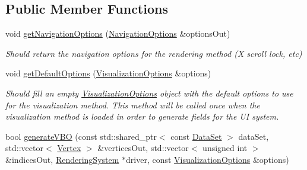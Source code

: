 \subsection*{Public Member Functions}
\begin{DoxyCompactItemize}
\item 
void \hyperlink{class_lots_of_lines_1_1_parallel_coordinates_visualization_method_a9fc4a16e5616115ad9e8c983fefb80ab}{get\+Navigation\+Options} (\hyperlink{struct_lots_of_lines_1_1_navigation_options}{Navigation\+Options} \&options\+Out)\hypertarget{class_lots_of_lines_1_1_parallel_coordinates_visualization_method_a9fc4a16e5616115ad9e8c983fefb80ab}{}\label{class_lots_of_lines_1_1_parallel_coordinates_visualization_method_a9fc4a16e5616115ad9e8c983fefb80ab}

\begin{DoxyCompactList}\small\item\em Should return the navigation options for the rendering method (X scroll lock, etc) \end{DoxyCompactList}\item 
void \hyperlink{class_lots_of_lines_1_1_parallel_coordinates_visualization_method_a47f47082f6638364ca12c521b8520e30}{get\+Default\+Options} (\hyperlink{class_lots_of_lines_1_1_visualization_options}{Visualization\+Options} \&options)\hypertarget{class_lots_of_lines_1_1_parallel_coordinates_visualization_method_a47f47082f6638364ca12c521b8520e30}{}\label{class_lots_of_lines_1_1_parallel_coordinates_visualization_method_a47f47082f6638364ca12c521b8520e30}

\begin{DoxyCompactList}\small\item\em Should fill an empty \hyperlink{class_lots_of_lines_1_1_visualization_options}{Visualization\+Options} object with the default options to use for the visualization method. This method will be called once when the visualization method is loaded in order to generate fields for the UI system. \end{DoxyCompactList}\item 
bool \hyperlink{class_lots_of_lines_1_1_parallel_coordinates_visualization_method_a4c08598cae13367a5b77828be347ac2e}{generate\+V\+BO} (const std\+::shared\+\_\+ptr$<$ const \hyperlink{class_lots_of_lines_1_1_data_set}{Data\+Set} $>$ data\+Set, std\+::vector$<$ \hyperlink{struct_lots_of_lines_1_1_vertex}{Vertex} $>$ \&vertices\+Out, std\+::vector$<$ unsigned int $>$ \&indices\+Out, \hyperlink{class_lots_of_lines_1_1_rendering_system}{Rendering\+System} $\ast$driver, const \hyperlink{class_lots_of_lines_1_1_visualization_options}{Visualization\+Options} \&options)\hypertarget{class_lots_of_lines_1_1_parallel_coordinates_visualization_method_a4c08598cae13367a5b77828be347ac2e}{}\label{class_lots_of_lines_1_1_parallel_coordinates_visualization_method_a4c08598cae13367a5b77828be347ac2e}


\end{DoxyCompactItemize}
